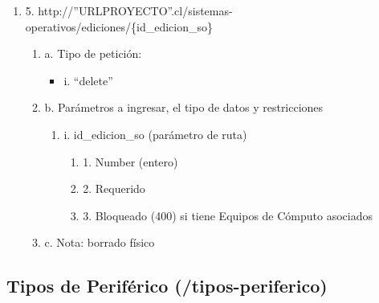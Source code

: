 \begin{enumerate}
    \item 5. http://”URLPROYECTO”.cl/sistemas-operativos/ediciones/\{id\_edicion\_so\}
    \begin{enumerate}
        \item a. Tipo de petición:
            \begin{itemize}
               \item i. “delete”
            \end{itemize}
        \item b. Parámetros a ingresar, el tipo de datos y restricciones
            \begin{enumerate}
                \item i. id\_edicion\_so (parámetro de ruta)
                    \begin{enumerate}
                        \item 1. Number (entero)
                        \item 2. Requerido
                        \item 3. Bloqueado (400) si tiene Equipos de Cómputo asociados
                    \end{enumerate}
            \end{enumerate}
        \item c. Nota: borrado físico
    \end{enumerate}
\end{enumerate}

\subsection{Tipos de Periférico (/tipos-periferico)}

